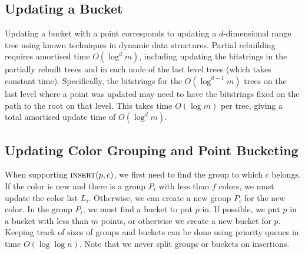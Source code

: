 \subsection{Updating a Bucket}
%
Updating a bucket with a point corresponds to updating a $d$-dimensional range tree using known techniques in dynamic data structures. Partial rebuilding \cite{andersson1999general, overmars1983design} requires amortised time $O(\log^d m)$, including updating the bitstrings in the partially rebuilt trees and in each node of the last level trees (which takes constant time). Specifically, the bitstrings for the $O(\log^{d-1} m)$ trees on the last level where a point was updated may need to have the bitstrings fixed on the path to the root on that level. This takes time $O(\log m)$ per tree, giving a total amortised update time of $O(\log^d m)$.

\subsection{Updating Color Grouping and Point Bucketing}
\label{sub:update-color-group-bucket}
%
When supporting $\textsc{insert}(p, c)$, we first need to find the group to which $c$ belongs. If the color is new and there is a group $P_i$ with less than $f$ colors, we must update the color list $L_i$. Otherwise, we can create a new group $P_i$ for the new color. In the group $P_i$, we must find a bucket to put $p$ in. If possible, we put $p$ in a bucket with less than $m$ points, or otherwise we create a new bucket for $p$. Keeping track of sizes of groups and buckets can be done using priority queues in time $O(\log \log n)$. Note that we never split groups or buckets on insertions.


